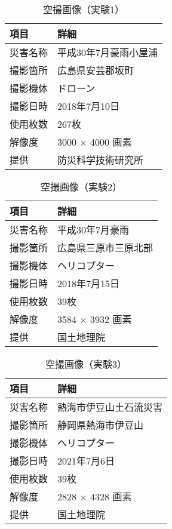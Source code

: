     \begin{table}[t]
      \centering
      \caption{空撮画像（実験1）}
      \label{使用空撮画像}
      \begin{tabular}{ll}
        \hline
        項目 & 詳細 \\
        \hline \hline
        災害名称 & 平成30年7月豪雨小屋浦 \\
        撮影箇所 & 広島県安芸郡坂町 \\
        撮影機体 & ドローン \\
        撮影日時 & 2018年7月10日 \\
        使用枚数 & 267枚 \\
        解像度 & 3000 $\times$ 4000 画素 \\
        提供 & 防災科学技術研究所 \\ \hline
      \end{tabular}
    \end{table}

    \begin{table}[t]
      \centering
      \caption{空撮画像（実験2）}
      \begin{tabular}{ll}
        \hline
        項目 & 詳細 \\
        \hline \hline
        災害名称 & 平成30年7月豪雨 \\
        撮影箇所 & 広島県三原市三原北部 \\
        撮影機体 & ヘリコプター \\
        撮影日時 & 2018年7月15日 \\
        使用枚数 & 39枚 \\
        解像度 & 3584 $\times$ 3932 画素 \\
        提供 & 国土地理院 \\ \hline
      \end{tabular}
    \end{table}

    \begin{table}[t]
      \centering
      \caption{空撮画像（実験3）}
      \begin{tabular}{ll}
        \hline
        項目 & 詳細 \\
        \hline \hline
        災害名称 & 熱海市伊豆山土石流災害 \\
        撮影箇所 & 静岡県熱海市伊豆山 \\
        撮影機体 & ヘリコプター \\
        撮影日時 & 2021年7月6日 \\
        使用枚数 & 39枚 \\
        解像度 & 2828 $\times$ 4328 画素 \\
        提供 & 国土地理院 \\ \hline
      \end{tabular}
    \end{table}

